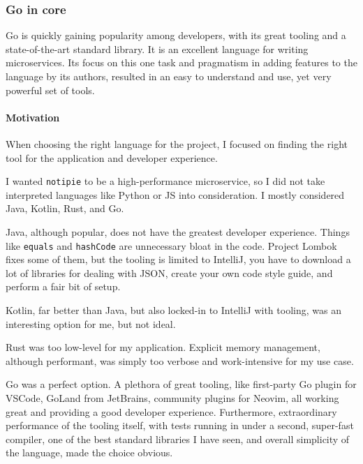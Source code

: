 \subsubsection{Go in core}\label{sec:go-in-core}

Go is quickly gaining popularity among developers,
with its great tooling
and a state-of-the-art standard library.
It is an excellent language for writing microservices.
Its focus on this one task
and pragmatism in adding features to the language by its authors,
resulted in an easy to understand and use,
yet very powerful set of tools.

\paragraph{Motivation}\label{sec:motivation}

When choosing the right language for the project,
I focused on finding the right tool
for the application and developer experience.

I wanted \texttt{notipie} to be a high-performance microservice,
so I did not take interpreted languages
like Python or \acf{JS} into consideration.
I mostly considered Java, Kotlin, Rust, and Go.

Java, although popular, does not have the greatest developer experience.
Things like \texttt{equals} and \texttt{hashCode}
are unnecessary bloat in the code.
Project Lombok~\cite{zwitserloot_project_2022} fixes some of them,
but the tooling is limited to IntelliJ,
you have to download a lot of libraries for dealing with \ac{JSON},
create your own code style guide,
and perform a fair bit of setup.

Kotlin, far better than Java,
but also locked-in to IntelliJ with tooling,
was an interesting option for me, but not ideal.

Rust was too low-level for my application.
Explicit memory management, although performant,
was simply too verbose and work-intensive for my use case.

Go was a perfect option.
A plethora of great tooling,
like first-party Go plugin for \ac{VSCode}, GoLand from JetBrains,
community plugins for Neovim,
all working great and providing a good developer experience.
Furthermore, extraordinary performance of the tooling itself,
with tests running in under a second, super-fast compiler,
one of the best standard libraries I have seen,
and overall simplicity of the language, made the choice obvious.
